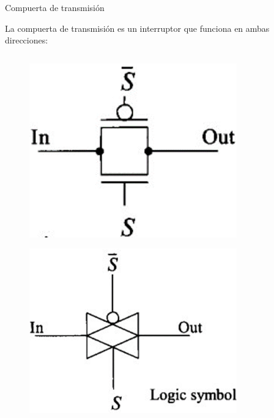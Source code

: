 \documentclass[aspectratio=169,t]{beamer}
\begin{document}
\begin{frame}{Compuerta de transmisión}

La compuerta de transmisión es un interruptor que funciona en ambas direcciones:

\begin{columns}

\begin{column}{0.3\textwidth}

\begin{figure}
    \centering
    \includegraphics[width=0.8\textwidth]{figuras/transmission_gate_1.png}
\end{figure}

\begin{figure}
    \centering
    \includegraphics[width=0.8\textwidth]{figuras/transmission_gate_2.png}
\end{figure}

\end{column}


\end{columns}
\end{frame}
\end{document}
